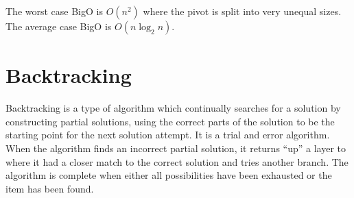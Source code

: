 The worst case BigO is $O(n^2)$ where the pivot is split into very unequal sizes.\\

The average case BigO is $O(n\log_2n)$. 

\section{Backtracking}
Backtracking is a type of algorithm which continually searches for a solution by constructing partial solutions, using the correct parts of the solution to be the starting point for the next solution attempt. It is a trial and error algorithm.\\

When the algorithm finds an incorrect partial solution, it returns ``up'' a layer to where it had a closer match to the correct solution and tries another branch. The algorithm is complete when either all possibilities have been exhausted or the item has been found.
